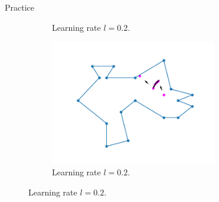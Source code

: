 \documentclass{beamer}
\begin{document}
\begin{frame}{Practice}
\begin{figure}[h!]
\begin{subfigure}{0.45\textwidth}
			\caption{Learning rate $l = 0.2$.}
			\label{fig:comb_gradient}
		\end{subfigure}
		\begin{subfigure}{0.45\textwidth}
			\centering
			\includegraphics[width = 0.8\textwidth]{Images/random_gradient.png}
			\caption{Learning rate $l = 0.2$.}
			\label{fig:random_gradient}
		\end{subfigure}
		\label{fig:gradients}
	\end{figure}
\end{frame}

\end{document}
